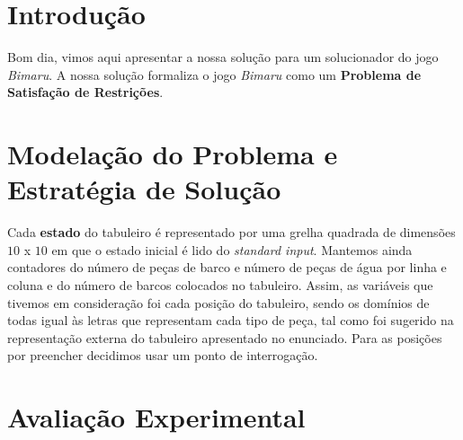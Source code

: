 \documentclass[12pt,a4paper]{article}
\begin{document}
\section{Introdução}
Bom dia, vimos aqui apresentar a nossa solução para um solucionador do jogo \textit{Bimaru}.
A nossa solução formaliza o jogo \textit{Bimaru} como um \textbf{Problema de Satisfação de Restrições}.

\section{Modelação do Problema e Estratégia de Solução}
Cada \textbf{estado} do tabuleiro é representado por uma grelha quadrada de dimensões $10$ x $10$ em que
o estado inicial é lido do \textit{standard input}. Mantemos ainda contadores do número de peças de barco e
número de peças de água por linha e coluna e do número de barcos colocados no tabuleiro.
Assim, as variáveis que tivemos em consideração foi cada posição do tabuleiro, sendo os domínios de todas igual
às letras que representam cada tipo de peça, tal como foi sugerido na representação externa do tabuleiro
apresentado no enunciado. Para as posições por preencher decidimos usar um ponto de interrogação.




\section{Avaliação Experimental}
\end{document}
